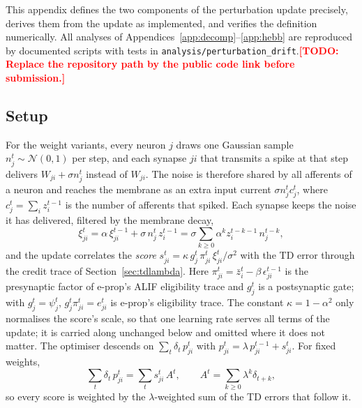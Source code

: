 \documentclass[10pt,twocolumn]{article}
\newcommand{\todo}[1]{\textcolor{red}{\bfseries[TODO: #1]}}
\begin{document}
This appendix defines the two components of the perturbation update precisely,
derives them from the update as implemented, and verifies the definition
numerically. All analyses of Appendices~\ref{app:decomp}--\ref{app:hebb} are
reproduced by documented scripts with tests in
\texttt{analysis/perturbation\_drift}.\todo{Replace the repository path by the public
code link before submission.}

\subsection{Setup}
\label{app:decomp-setup}
For the weight variants, every neuron $j$ draws one Gaussian sample
$n^t_j\sim\mathcal{N}(0,1)$ per step, and each synapse $ji$ that transmits a
spike at that step delivers $W_{ji}+\sigma n^t_j$ instead of $W_{ji}$. The noise
is therefore shared by all afferents of a neuron and reaches the membrane as an
extra input current $\sigma n^t_j c^t_j$, where
$c^t_j=\sum_i z^{t-1}_i$ is the number of afferents that spiked. Each synapse
keeps the noise it has delivered, filtered by the membrane decay,
\begin{equation}
\xi^t_{ji}=\alpha\,\xi^{t-1}_{ji}+\sigma\,n^t_j\,z^{t-1}_i
=\sigma\sum_{k\ge0}\alpha^k z^{t-k-1}_i\,n^{t-k}_j ,
\label{eq:app-xi}
\end{equation}
and the update correlates the \emph{score}
$s^t_{ji}=\kappa\,g^t_j\,\pi^t_{ji}\,\xi^t_{ji}/\sigma^2$ with the TD error through the
credit trace of Section~\ref{sec:tdlambda}. Here
$\pi^t_{ji}=\bar z^t_i-\beta\,\epsilon^{t-1}_{ji}$ is the presynaptic factor of
e-prop's ALIF eligibility trace and $g^t_j$ is a postsynaptic gate; with
$g^t_j=\psi^t_j$, $g^t_j\pi^t_{ji}=e^t_{ji}$ is e-prop's eligibility trace.
The constant $\kappa=1-\alpha^2$ only normalises the score's scale, so that one
learning rate serves all terms of the update; it is carried along unchanged below
and omitted where it does not matter. The optimiser descends on $\sum_t\delta_t\,p^t_{ji}$ with
$p^t_{ji}=\lambda\,p^{t-1}_{ji}+s^t_{ji}$. For fixed weights,
\begin{equation}
\sum_t\delta_t\,p^t_{ji}=\sum_t s^t_{ji}\,A^t,\qquad
A^t=\sum_{k\ge0}\lambda^k\delta_{t+k},
\label{eq:app-forward}
\end{equation}
so every score is weighted by the $\lambda$-weighted sum of the TD errors that
follow it.
\end{document}
